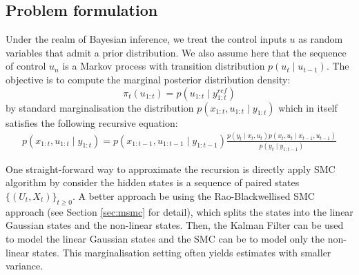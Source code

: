 \subsection{Problem formulation}
Under the realm of Bayesian inference, we treat the control inputs $u$ as random variables that admit a prior distribution. We also assume here that the sequence of control $u_n$ is a Markov process with transition distribution $p(u_t \mid u_{t-1})$. The objective is to compute the marginal posterior distribution density:
\begin{equation}
 \pi_t(u_{1:t}) = p(u_{1:t} \mid y^{ref}_{1:t})
\end{equation} 
by standard marginalisation the distribution $p(x_{1:t}, u_{1:t} \mid y_{1:t})$ which in itself satisfies the following recursive equation:
\begin{align}
  p(x_{1:t}, u_{1:t} \mid y_{1:t}) = p(x_{1:t-1}, u_{1:t-1} \mid y_{1:t-1}) \frac{p(y_t \mid x_t, u_t)p(x_t, u_t \mid x_{t-1}, u_{t-1})}{p(y_t \mid y_{1:t-1})}
\end{align}
 
 
 
One straight-forward way to approximate the recursion is directly apply SMC algorithm by consider the hidden states is a sequence of paired states $\{(U_t, X_t)\}_{t \geq 0}$. A better approach be using the Rao-Blackwellised SMC approach (see Section \ref{sec:msmc} for detail), which splits the states into the linear Gaussian states and the non-linear states. Then, the Kalman Filter can be used to model the linear Gaussian states and the SMC can be to model only the non-linear states. This marginalisation setting often yields estimates with smaller variance.


